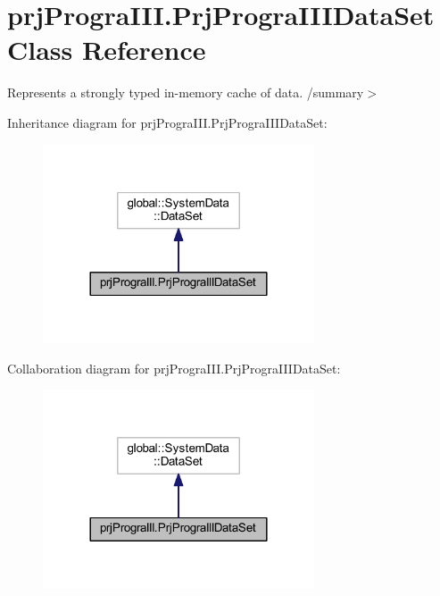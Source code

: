 \hypertarget{classprj_progra_i_i_i_1_1_prj_progra_i_i_i_data_set}{}\section{prj\+Progra\+I\+I\+I.\+Prj\+Progra\+I\+I\+I\+Data\+Set Class Reference}
\label{classprj_progra_i_i_i_1_1_prj_progra_i_i_i_data_set}


Represents a strongly typed in-\/memory cache of data. /summary$>$  




Inheritance diagram for prj\+Progra\+I\+I\+I.\+Prj\+Progra\+I\+I\+I\+Data\+Set\+:
\nopagebreak
\begin{figure}[H]
\begin{center}
\leavevmode
\includegraphics[width=228pt]{classprj_progra_i_i_i_1_1_prj_progra_i_i_i_data_set__inherit__graph}
\end{center}
\end{figure}


Collaboration diagram for prj\+Progra\+I\+I\+I.\+Prj\+Progra\+I\+I\+I\+Data\+Set\+:
\nopagebreak
\begin{figure}[H]
\begin{center}
\leavevmode
\includegraphics[width=228pt]{classprj_progra_i_i_i_1_1_prj_progra_i_i_i_data_set__coll__graph}
\end{center}
\end{figure}
